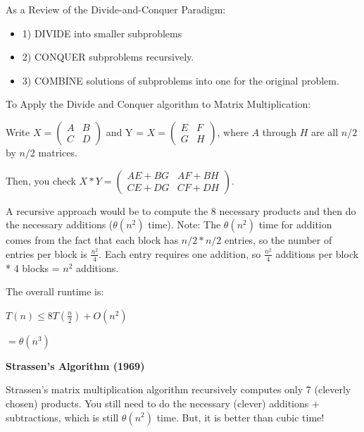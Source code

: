 \documentclass[11pt]{article}
\begin{document}
As a Review of the Divide-and-Conquer Paradigm:
\begin{itemize}
    \item 1) DIVIDE into smaller subproblems
    \item 2) CONQUER subproblems recursively.
    \item 3) COMBINE solutions of subproblems into one for the original problem.
\end{itemize}
\vspace{11pt}

To Apply the Divide and Conquer algorithm to Matrix Multiplication:

Write $X=\begin{pmatrix}
A & B \\
C & D
\end{pmatrix}$ and Y = $X=\begin{pmatrix}
E & F \\
G & H
\end{pmatrix}$, where $A$ through $H$ are all $n/2$ by $n/2$ matrices.

Then, you check $X*Y=\begin{pmatrix}
    AE + BG & AF + BH \\
    CE + DG & CF + DH
\end{pmatrix}$.

A recursive approach would be to compute the 8 necessary products and then do the necessary additions ($\theta(n^2)$ time). Note: The $\theta(n^2)$ time for addition comes from the fact that each block has $n/2*n/2$ entries, so the number of entries per block is $\frac{n^2}{4}$. Each entry requires one addition, so $\frac{n^2}{4}$ additions per block * 4 blocks = $n^2$ additions.

The overall runtime is:

\vspace{11pt}
\begin{center}
    $T(n) \leq 8T(\frac{n}{2})+O(n^2)$
    
    $=\theta(n^3)$
\end{center}
\vspace{11pt}

\textbf{Strassen's Algorithm (1969)}
\vspace{11pt}

Strassen's matrix multiplication algorithm recursively computes only 7 (cleverly chosen) products. You still need to do the necessary (clever) additions + subtractions, which is still $\theta(n^2)$ time. But, it is better than cubic time!
\end{document}
